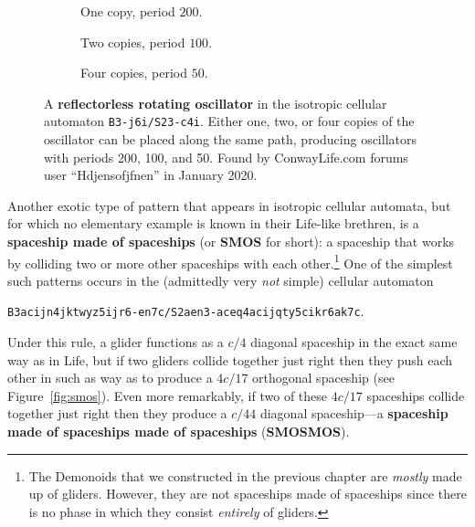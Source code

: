 \begin{figure}[!htb]
	\centering
	\begin{subfigure}{.32\textwidth}
		\centering
		\caption{One copy, period $200$.}
		\label{fig:reflectorless_rotating_oscillator1}
	\end{subfigure} \hfill %
	\begin{subfigure}{.32\textwidth}
		\centering
		\caption{Two copies, period $100$.}
		\label{fig:reflectorless_rotating_oscillator2}
	\end{subfigure} \hfill %
	\begin{subfigure}{.32\textwidth}
		\centering
		\caption{Four copies, period $50$.}
		\label{fig:reflectorless_rotating_oscillator4}
	\end{subfigure}
	\caption{A \textbf{reflectorless rotating oscillator} in the isotropic cellular automaton \texttt{B3-j6i/S23-c4i}. Either one, two, or four copies of the oscillator can be placed along the same path, producing oscillators with periods 200, 100, and 50. Found by ConwayLife.com forums user ``Hdjensofjfnen'' in January 2020.}\label{fig:reflectorless_rotating_oscillator}
\end{figure}

Another exotic type of pattern that appears in isotropic cellular automata, but for which no elementary example is known in their Life-like brethren, is a \textbf{spaceship made of spaceships} (or \textbf{SMOS} for short): a spaceship that works by colliding two or more other spaceships with each other.\footnote{The Demonoids that we constructed in the previous chapter are \emph{mostly} made up of gliders. However, they are not spaceships made of spaceships since there is no phase in which they consist \emph{entirely} of gliders.} One of the simplest such patterns occurs in the (admittedly very \emph{not} simple) cellular automaton
\begin{center}
	\texttt{B3acijn4jktwyz5ijr6-en7c/S2aen3-aceq4acijqty5cikr6ak7c}.
\end{center}
Under this rule, a glider functions as a $c/4$ diagonal spaceship in the exact same way as in Life, but if two gliders collide together just right then they push each other in such as way as to produce a $4c/17$ orthogonal spaceship (see Figure~\ref{fig:smos}). Even more remarkably, if two of these $4c/17$ spaceships collide together just right then they produce a $c/44$ diagonal spaceship---a \textbf{spaceship made of spaceships made of spaceships} (\textbf{SMOSMOS}).

